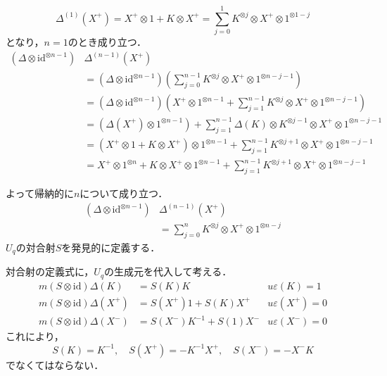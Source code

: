 \documentclass[10pt,dvipdfm]{beamer}
\begin{document}
  \begin{frame}
    \[
    \Delta^{(1)}(X^+) = X^+\otimes 1 + K\otimes X^+ = \sum_{j=0}^{1}K^{\otimes j}\otimes X^+\otimes 1^{\otimes 1-j}
    \]
    となり，$n=1$のとき成り立つ．
    \begin{align*}
      (\Delta\otimes\text{id}^{\otimes n-1})&\Delta^{(n-1)}(X^+)\\
      &= (\Delta\otimes\text{id}^{\otimes n-1})\left(\sum_{j=0}^{n-1}K^{\otimes j}\otimes X^+\otimes 1^{\otimes n-j-1}\right)\\
      &= (\Delta\otimes\text{id}^{\otimes n-1})\left(X^+\otimes 1^{\otimes n-1} + \sum_{j=1}^{n-1}K^{\otimes j}\otimes X^+\otimes 1^{\otimes n-j-1}\right)\\
      &= (\Delta(X^+)\otimes 1^{\otimes n-1}) + \sum_{j=1}^{n-1}\Delta(K)\otimes K^{\otimes j-1}\otimes X^+\otimes 1^{\otimes n-j-1}\\
      &= (X^+\otimes 1 + K\otimes X^+)\otimes1^{\otimes n-1} + \sum_{j=1}^{n-1}K^{\otimes j+1}\otimes X^+\otimes 1^{\otimes n-j-1}\\
      &= X^+\otimes 1^{\otimes n} + K\otimes X^+\otimes 1^{\otimes n-1} + \sum_{j=1}^{n-1}K^{\otimes j+1}\otimes X^+\otimes 1^{\otimes n-j-1}
    \end{align*}
  \end{frame}
  \begin{frame}
    よって帰納的に$n$について成り立つ．
    \begin{align*}
      (\Delta\otimes\text{id}^{\otimes n-1})&\Delta^{(n-1)}(X^+)\\
      &= \sum_{j=0}^{n}K^{\otimes j}\otimes X^+\otimes 1^{\otimes n-j}
    \end{align*}
    $U_q$の対合射$S$を発見的に定義する．

    対合射の定義式に，$U_q$の生成元を代入して考える．
    \begin{align*}
      m(S\otimes\text{id})\Delta(K) &= S(K)K & u \varepsilon(K)=1\\
      m(S\otimes\text{id})\Delta(X^+) &= S(X^+)1 + S(K)X^+ & u \varepsilon(X^+)=0\\
      m(S\otimes\text{id})\Delta(X^-) &= S(X^-)K^{-1} + S(1)X^- & u \varepsilon(X^-)=0
    \end{align*}
    これにより，
    \[
    S(K)=K^{-1},\quad S(X^+)=-K^{-1}X^+,\quad S(X^-)=-X^-K
    \]
    でなくてはならない．
  \end{frame}
\end{document}
